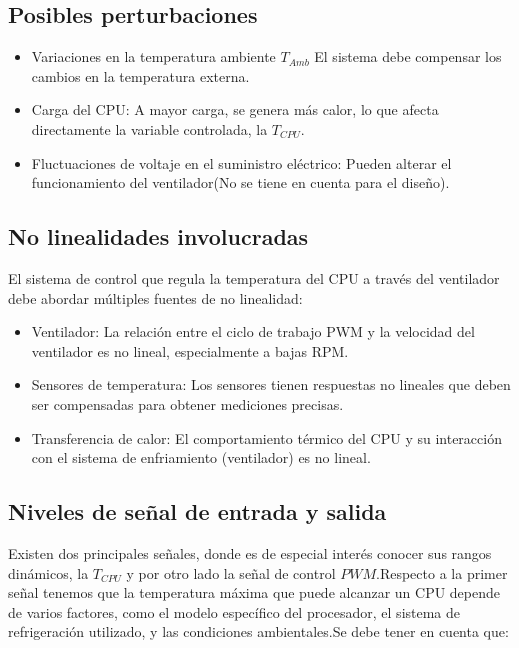 \documentclass[12pt]{article}
\begin{document}
	
	\subsection{Posibles perturbaciones}
	\begin{itemize}
		\item Variaciones en la temperatura ambiente $T_{Amb}$ El sistema debe compensar los cambios en la temperatura externa.
		\item Carga del CPU: A mayor carga, se genera más calor, lo que afecta directamente la variable controlada, la $T_{CPU}$.
		\item Fluctuaciones de voltaje en el suministro eléctrico: Pueden alterar el funcionamiento del ventilador(No se tiene en cuenta para el diseño).
	\end{itemize}
	
	\subsection{No linealidades involucradas}
	El sistema de control que regula la temperatura del CPU a través del ventilador debe abordar múltiples fuentes de no linealidad:
	
	\begin{itemize}
		\item Ventilador: La relación entre el ciclo de trabajo PWM y la velocidad del ventilador es no lineal, especialmente a bajas RPM.
		\item Sensores de temperatura: Los sensores tienen respuestas no lineales que deben ser compensadas para obtener mediciones precisas.
		\item Transferencia de calor: El comportamiento térmico del CPU y su interacción con el sistema de enfriamiento (ventilador) es no lineal.
	\end{itemize}
	
	\subsection{Niveles de señal de entrada y salida}
	Existen dos principales señales, donde es de especial interés conocer sus rangos dinámicos, la  $T_{CPU}$ y por otro lado la señal de control $PWM$.Respecto a la primer señal tenemos que la temperatura máxima que puede alcanzar un CPU depende de varios factores, como el modelo específico del procesador, el sistema de refrigeración utilizado, y las condiciones ambientales.Se debe tener en cuenta que:
	
\end{document}
